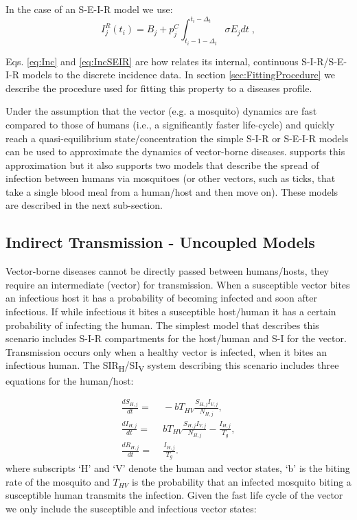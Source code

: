\documentclass[a4paper]{article}
\begin{document}
In the case of an S-E-I-R model we use:
\begin{equation}
I_j^R(t_i) = B_j + p_j^C \int_{t_i-1-\Delta_t}^{t_i-\Delta_t} {\sigma}{E_j} dt\;,
\label{eq:IncSEIR}
\end{equation}

Eqs. \eqref{eq:Inc} and \eqref{eq:IncSEIR} are how  relates its internal, continuous S-I-R/S-E-I-R models to the discrete incidence data.  In section \ref{sec:FittingProcedure} we describe the procedure used for fitting this property to a diseases profile.


Under the assumption that the vector (e.g. a mosquito) dynamics are fast compared to those of humans (i.e., a significantly faster life-cycle) and quickly reach a quasi-equilibrium state/concentration the simple S-I-R or S-E-I-R models can be used to approximate the dynamics of vector-borne diseases.   supports this approximation but it also supports two models that describe the spread of infection between humans via mosquitoes (or other vectors, such as ticks, that take a single blood meal from a  human/host and then move on). These models are described in the next sub-section.


\subsection{Indirect Transmission - Uncoupled Models}
\label{sec:singleIndrct}

Vector-borne diseases cannot be  directly passed between humans/hosts, they require an intermediate (vector) for transmission. When a susceptible vector bites an infectious host it has a probability of becoming infected and soon after infectious.  If while infectious it bites a susceptible host/human it has a certain probability of infecting the human. The simplest model that describes this scenario includes S-I-R compartments for the host/human and S-I for the vector.   Transmission occurs only when a healthy vector is infected, when it bites an infectious human. The SIR\textsubscript{H}/SI\textsubscript{V} system describing this scenario includes three equations for the human/host:

\begin{align}
\frac{dS_{H,j}}{dt} =&\; - b T_{HV}\frac{S_{H,j} I_{V,j}}{N_{H,j}}, \label{eq:eqVSIR1} \\
\frac{dI_{H,j}}{dt} =&\;   b T_{HV}\frac{S_{H,j} I_{V,j}}{N_{H,j}} - \frac{I_{H,j}}{T_g},  \label{eq:eqVSIR2} \\
\frac{dR_{H,j}}{dt} =&\; \frac{I_{H,j}}{T_g}. \label{eq:eqVSIR3}
\end{align}
where subscripts `H' and `V' denote the human and vector states, `b' is the biting rate of the mosquito and $T_{HV}$ is the probability that an infected mosquito biting a susceptible human transmits the infection. Given the fast life cycle of the vector we only include the susceptible and infectious vector states:
\end{document}
